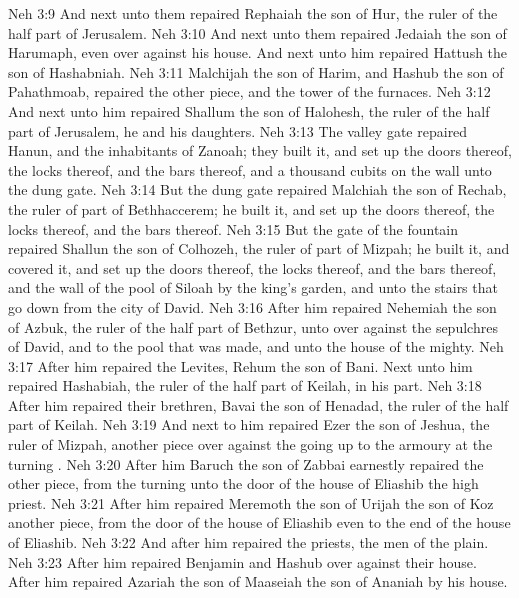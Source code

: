 \vs Neh 3:9 And next unto them repaired Rephaiah the son of Hur, the ruler of the half part of Jerusalem.
\vs Neh 3:10 And next unto them repaired Jedaiah the son of Harumaph, even over against his house. And next unto him repaired Hattush the son of Hashabniah.
\vs Neh 3:11 Malchijah the son of Harim, and Hashub the son of Pahathmoab, repaired the other piece, and the tower of the furnaces.
\vs Neh 3:12 And next unto him repaired Shallum the son of Halohesh, the ruler of the half part of Jerusalem, he and his daughters.
\vs Neh 3:13 The valley gate repaired Hanun, and the inhabitants of Zanoah; they built it, and set up the doors thereof, the locks thereof, and the bars thereof, and a thousand cubits on the wall unto the dung gate.
\vs Neh 3:14 But the dung gate repaired Malchiah the son of Rechab, the ruler of part of Bethhaccerem; he built it, and set up the doors thereof, the locks thereof, and the bars thereof.
\vs Neh 3:15 But the gate of the fountain repaired Shallun the son of Colhozeh, the ruler of part of Mizpah; he built it, and covered it, and set up the doors thereof, the locks thereof, and the bars thereof, and the wall of the pool of Siloah by the king's garden, and unto the stairs that go down from the city of David.
\vs Neh 3:16 After him repaired Nehemiah the son of Azbuk, the ruler of the half part of Bethzur, unto  over against the sepulchres of David, and to the pool that was made, and unto the house of the mighty.
\vs Neh 3:17 After him repaired the Levites, Rehum the son of Bani. Next unto him repaired Hashabiah, the ruler of the half part of Keilah, in his part.
\vs Neh 3:18 After him repaired their brethren, Bavai the son of Henadad, the ruler of the half part of Keilah.
\vs Neh 3:19 And next to him repaired Ezer the son of Jeshua, the ruler of Mizpah, another piece over against the going up to the armoury at the turning .
\vs Neh 3:20 After him Baruch the son of Zabbai earnestly repaired the other piece, from the turning  unto the door of the house of Eliashib the high priest.
\vs Neh 3:21 After him repaired Meremoth the son of Urijah the son of Koz another piece, from the door of the house of Eliashib even to the end of the house of Eliashib.
\vs Neh 3:22 And after him repaired the priests, the men of the plain.
\vs Neh 3:23 After him repaired Benjamin and Hashub over against their house. After him repaired Azariah the son of Maaseiah the son of Ananiah by his house.
